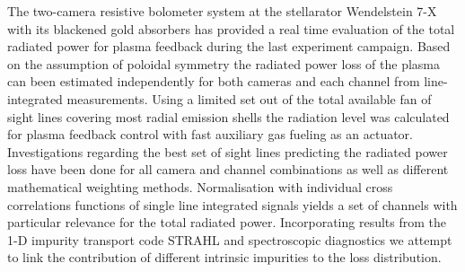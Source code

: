 \documentclass{scdpg}
\begin{document}
%
\begin{scAbstract}
%
%
%
%
%
%
%
\scBeginText
%
The two-camera resistive bolometer system at the stellarator Wendelstein 7-X with its blackened gold absorbers has provided a real time evaluation of the total radiated power for plasma feedback during the last experiment campaign. Based on the assumption of poloidal symmetry the radiated power loss of the plasma can been estimated independently for both cameras and each channel from line-integrated measurements. Using a limited set out of the total available fan of sight lines covering most radial emission shells the radiation level was calculated for plasma feedback control with fast auxiliary gas fueling as an actuator. Investigations regarding the best set of sight lines predicting the radiated power loss have been done for all camera and channel combinations as well as different mathematical weighting methods. Normalisation with individual cross correlations functions of single line integrated signals yields a set of channels with particular relevance for the total radiated power. Incorporating results from the 1-D impurity transport code STRAHL and spectroscopic diagnostics we attempt to link the contribution of different intrinsic impurities to the loss distribution.

\end{scAbstract}
\end{document}
